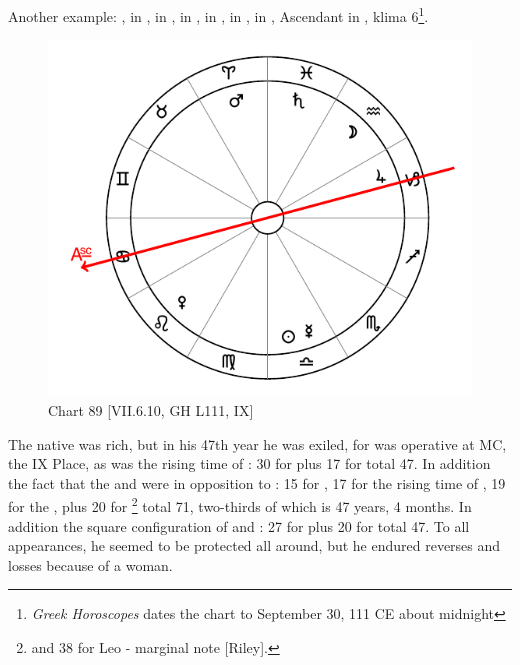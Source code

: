 Another example: \Sun, \Mercury\xspace in \Libra, \Moon\xspace in \Aquarius, \Saturn\xspace in \Pisces, \Jupiter\xspace in \Capricorn,
\Mars\xspace in \Aries, \Venus\xspace in \Leo, Ascendant in \Cancer, klima 6\footnote{\textit{Greek Horoscopes} dates the chart to September 30, 111 CE about midnight}.

\begin{figure}
\centering
\vspace{0pt}
\includegraphics[width=.68\textwidth]{charts/7_6_10}
\caption{Chart 89 [VII.6.10, GH L111, IX] }
\label{fig:chart89}
\end{figure} 

The native was rich, but in his 47th year he was exiled, for \Saturn\xspace was operative at MC, the IX Place, as was the rising time of \Pisces: 30 for \Saturn\xspace plus 17 for \Pisces\xspace total 47. In addition the fact that the \Sun\xspace and \Mercury\xspace were in opposition to \Mars\xspace <was operative>: 15 for \Mars, 17 for the rising time of \Aries, 19 for the \Sun, plus 20 for \Mercury\xspace\footnote{and 38 for Leo - marginal note [Riley].} total 71, two-thirds of which is 47 years, 4 months. In addition the square configuration of \Libra\xspace and \Capricorn\xspace <was operative>: 27 for \Capricorn\xspace plus 20 for \Libra\xspace total 47. To all appearances, he seemed to be protected all around, but he endured reverses and losses because of a woman.

